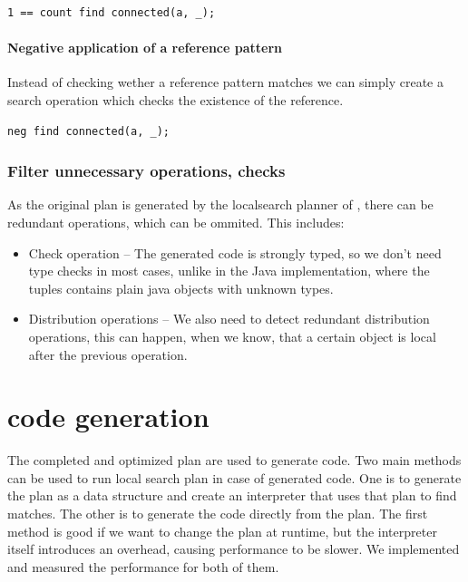\begin{lstlisting}[language = vql]
1 == count find connected(a, _);
\end{lstlisting}


\paragraph{Negative application of a reference pattern}
Instead of checking wether a reference pattern matches we can simply create a search operation which checks the existence of the reference.
\begin{lstlisting}[language = vql]
neg find connected(a, _);
\end{lstlisting}



\subsubsection{Filter unnecessary operations, checks}
As the original plan is generated by the localsearch planner of \viatra{}, there can be redundant operations, which can be ommited. This includes:

\begin{itemize}
	\item Check operation -- The generated code is strongly typed, so we don't need type checks in most cases, unlike in the Java implementation, where the tuples contains plain java objects with unknown types.
	
	\item Distribution operations -- We also need to detect redundant distribution operations, this can happen, when we know, that a certain object is local after the previous operation.
\end{itemize}



\section{\protect\cpptt{} code generation}

The completed and optimized plan are used to generate \cpp{} code. 
Two main methods can be used to run local search plan in case of generated code. 
One is to generate the plan as a data structure and create an interpreter that uses that plan to find matches. 
The other is to generate the code directly from the plan. 
The first method is good if we want to change the plan at runtime, but the interpreter itself introduces an overhead, causing performance to be slower.
We implemented and measured the performance for both of them.

